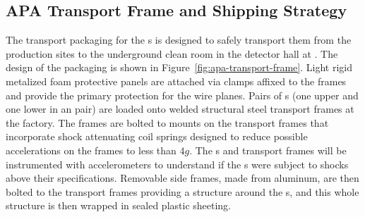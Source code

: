 

\subsection{APA Transport Frame and Shipping Strategy}
\label{sec:fdsp-apa-transport-container}

The transport packaging for the s is designed to safely transport them from the production sites to the underground clean room in the detector hall at . 
The design of the packaging is shown in Figure~\ref{fig:apa-transport-frame}. Light rigid metalized foam protective panels are attached via clamps affixed to the  frames and provide the primary protection for the wire planes. Pairs of s (one upper and one lower in an  pair) are loaded onto welded structural steel transport frames at the factory. The  frames are bolted to mounts on the transport frames that incorporate shock attenuating coil springs designed to reduce possible accelerations on the  frames to less than $4g$. The s and transport frames will be instrumented with accelerometers to understand if the s were subject to shocks above their specifications. Removable side frames, made from aluminum, are then bolted to the transport frames providing a structure around the s, and this whole structure is then wrapped in sealed plastic sheeting. 

